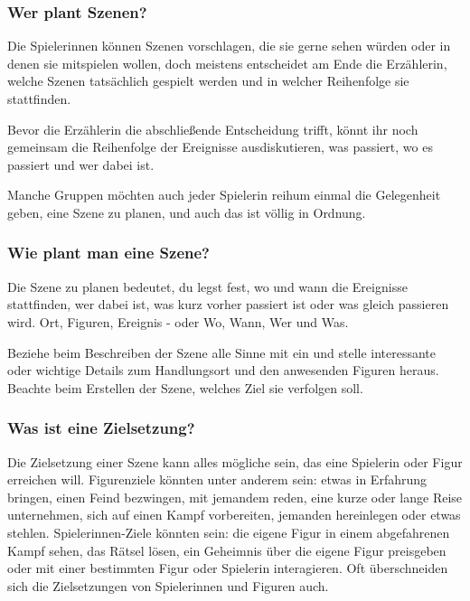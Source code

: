 \documentclass[]{article}
\begin{document}
\columnsbegin

\subsubsection{Wer plant Szenen?}\label{wer-plant-szenen}

Die Spielerinnen können Szenen vorschlagen, die sie gerne sehen würden
oder in denen sie mitspielen wollen, doch meistens entscheidet am Ende
die Erzählerin, welche Szenen tatsächlich gespielt werden und in welcher
Reihenfolge sie stattfinden.

Bevor die Erzählerin die abschließende Entscheidung trifft, könnt ihr
noch gemeinsam die Reihenfolge der Ereignisse ausdiskutieren, was
passiert, wo es passiert und wer dabei ist.

Manche Gruppen möchten auch jeder Spielerin reihum einmal die
Gelegenheit geben, eine Szene zu planen, und auch das ist völlig in
Ordnung.

\subsubsection{Wie plant man eine
Szene?}\label{wie-plant-man-eine-szene}

Die Szene zu planen bedeutet, du legst fest, wo und wann die Ereignisse
stattfinden, wer dabei ist, was kurz vorher passiert ist oder was gleich
passieren wird. Ort, Figuren, Ereignis - oder Wo, Wann, Wer und Was.

Beziehe beim Beschreiben der Szene alle Sinne mit ein und stelle
interessante oder wichtige Details zum Handlungsort und den anwesenden
Figuren heraus. Beachte beim Erstellen der Szene, welches Ziel sie
verfolgen soll.

\subsubsection{Was ist eine
Zielsetzung?}\label{was-ist-eine-zielsetzung}

Die Zielsetzung einer Szene kann alles mögliche sein, das eine Spielerin
oder Figur erreichen will. Figurenziele könnten unter anderem sein:
etwas in Erfahrung bringen, einen Feind bezwingen, mit jemandem reden,
eine kurze oder lange Reise unternehmen, sich auf einen Kampf
vorbereiten, jemanden hereinlegen oder etwas stehlen. Spielerinnen-Ziele
könnten sein: die eigene Figur in einem abgefahrenen Kampf sehen, das
Rätsel lösen, ein Geheimnis über die eigene Figur preisgeben oder mit
einer bestimmten Figur oder Spielerin interagieren. Oft überschneiden
sich die Zielsetzungen von Spielerinnen und Figuren auch.
\end{document}
